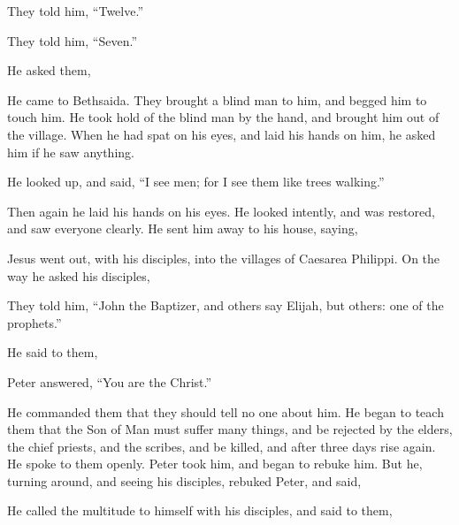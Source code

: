 {{{}}
\par }{\PP They told him, “Twelve.”
\par }{\PP {}
\par }{\PP They told him, “Seven.”
\par }{\PP {}He asked them,
{}
\par }{\PP {}He came to Bethsaida. They brought a blind man to him, and begged him to touch him.
He took hold of the blind man by the hand, and brought him out of the village. When he had spat on his eyes, and laid his hands on him, he asked him if he saw anything.
\par }{\PP {}He looked up, and said, “I see men; for I see them like trees walking.”
\par }{\PP {}Then again he laid his hands on his eyes. He looked intently, and was restored, and saw everyone clearly.
He sent him away to his house, saying,
{}
\par }{\PP {}Jesus went out, with his disciples, into the villages of Caesarea Philippi. On the way he asked his disciples,
{}
\par }{\PP {}They told him, “John the Baptizer, and others say Elijah, but others: one of the prophets.”
\par }{\PP {}He said to them,
{}
\par }{\PP Peter answered, “You are the Christ.”
\par }{\PP {}He commanded them that they should tell no one about him.
He began to teach them that the Son of Man must suffer many things, and be rejected by the elders, the chief priests, and the scribes, and be killed, and after three days rise again.
He spoke to them openly. Peter took him, and began to rebuke him.
But he, turning around, and seeing his disciples, rebuked Peter, and said,
{}
\par }{\PP {}He called the multitude to himself with his disciples, and said to them,
{}

}
